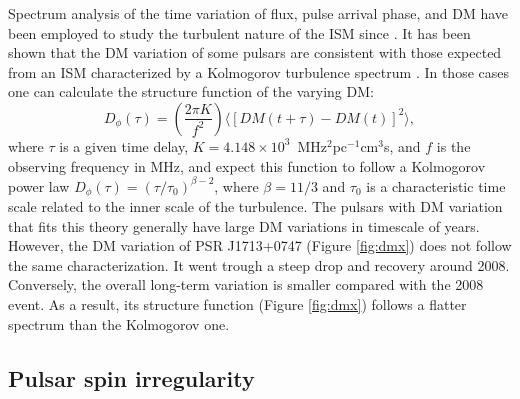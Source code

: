 Spectrum analysis of the time variation of flux, pulse arrival phase, and DM have 
been employed to study the turbulent nature of the ISM since \citealt{cpl86, rl90}.
It has been shown that the DM variation of some pulsars are consistent with
those expected from an ISM characterized by a Kolmogorov turbulence spectrum
\citep{cwd+90, ric90, ktr94, yhc+07, kcs+13, fst14}. In those cases one can calculate the 
structure function of the varying DM: 
\begin{equation}
D_{\phi}(\tau)=\left(\frac{2\pi K}{f^2}\right)\langle [DM(t+\tau)-DM(t)]^2\rangle, 
\end{equation}
where $\tau$ 
is a given time delay, $K=4.148\times10^3$~MHz$^2$pc$^{-1}$cm$^3$s, and $f$ is 
the observing frequency in MHz, and expect 
this function to follow a Kolmogorov power law $D_{\phi}(\tau)=(\tau/\tau_0)^{\beta -2}$, 
where $\beta=11/3$ and $\tau_0$ is a characteristic time scale related to 
the inner scale of the turbulence. The pulsars with DM variation that fits this
theory generally have large DM variations in timescale of 
years. However, the DM variation of PSR J1713+0747 (Figure \ref{fig:dmx}) does not 
follow the same characterization. It went trough a steep drop and recovery 
around 2008. Conversely, the overall long-term variation is smaller
compared with the 2008 event. As a result, its structure function (Figure \ref{fig:dmx}) 
follows a flatter spectrum than the Kolmogorov one.


\subsection{Pulsar spin irregularity}
\label{sec:noise}

